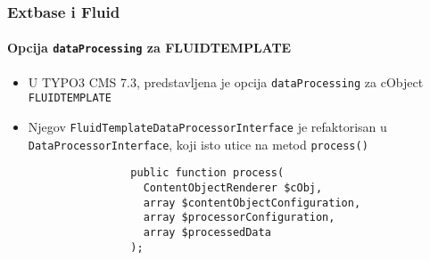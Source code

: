 \begin{frame}[fragile]
	\frametitle{Extbase i Fluid}
	\framesubtitle{Opcija \texttt{dataProcessing} za FLUIDTEMPLATE}

	\lstset{basicstyle=\tiny\ttfamily}

	\begin{itemize}

		\item U TYPO3 CMS 7.3, predstavljena je opcija \texttt{dataProcessing} za cObject \texttt{FLUIDTEMPLATE}

		\item Njegov \texttt{FluidTemplateDataProcessorInterface} je refaktorisan u \texttt{DataProcessorInterface},
			koji isto utice na metod \texttt{process()}

			\begin{lstlisting}
				public function process(
				  ContentObjectRenderer $cObj,
				  array $contentObjectConfiguration,
				  array $processorConfiguration,
				  array $processedData
				);
			\end{lstlisting}

	\end{itemize}

	\breakingchange

\end{frame}

